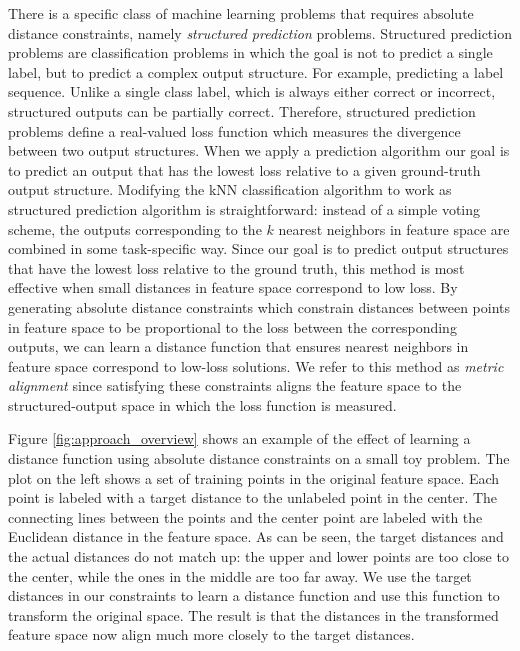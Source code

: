 There is a specific class of machine learning problems that requires absolute distance constraints, namely \emph{structured prediction} problems. Structured prediction problems are classification problems in which the goal is not to predict a single label, but to predict a complex output structure. For example, predicting a label sequence. Unlike a single class label, which is always either correct or incorrect, structured outputs can be partially correct. Therefore, structured prediction problems define a real-valued loss function which measures the divergence between two output structures. When we apply a prediction algorithm our goal is to predict an output that has the lowest loss relative to a given ground-truth output structure. Modifying the \ac{kNN} classification algorithm to work as structured prediction algorithm is straightforward: instead of a simple voting scheme, the outputs corresponding to the $k$ nearest neighbors in feature space are combined in some task-specific way. Since our goal is to predict output structures that have the lowest loss relative to the ground truth, this method is most effective when small distances in feature space correspond to low loss. By generating absolute distance constraints which constrain distances between points in feature space to be proportional to the loss between the corresponding outputs, we can learn a distance function that ensures nearest neighbors in feature space correspond to low-loss solutions. We refer to this method as \emph{metric alignment} since satisfying these constraints aligns the feature space to the structured-output space in which the loss function is measured.

Figure \ref{fig:approach_overview} shows an example of the effect of learning a distance function using absolute distance constraints on a small toy problem. The plot on the left shows a set of training points in the original feature space. Each point is labeled with a target distance to the unlabeled point in the center. The connecting lines between the points and the center point are labeled with the Euclidean distance in the feature space. As can be seen, the target distances and the actual distances do not match up: the upper and lower points are too close to the center, while the ones in the middle are too far away. We use the target distances in our constraints to learn a distance function and use this function to transform the original space. The result is that the distances in the transformed feature space now align much more closely to the target distances.

